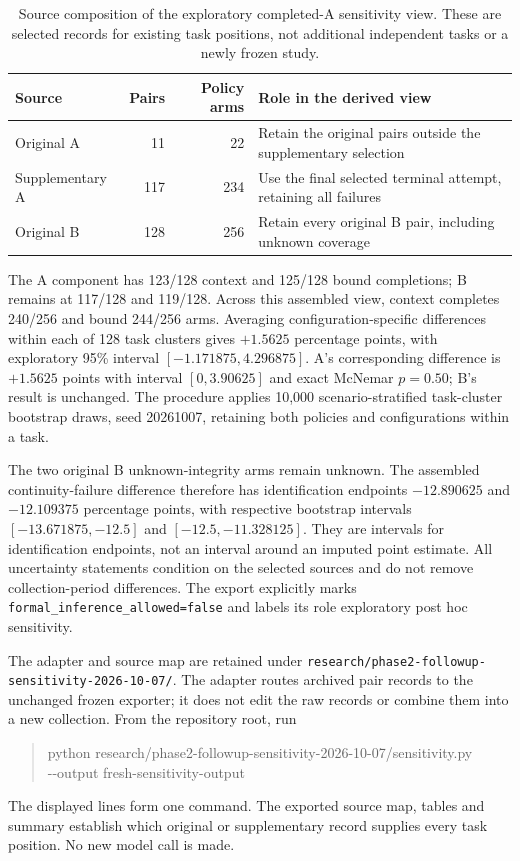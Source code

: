 \documentclass[11pt,a4paper]{article}
\newcommand{\code}[1]{\nolinkurl{#1}}
\begin{document}
\begin{table}[htbp]
\centering\small
\caption{Source composition of the exploratory completed-A sensitivity view. These are selected records for existing task positions, not additional independent tasks or a newly frozen study.}\label{tab:sensitivity-sources}
\begin{tabularx}{\textwidth}{@{}lrrX@{}}
\toprule
Source & Pairs & Policy arms & Role in the derived view \\
\midrule
Original A & 11 & 22 & Retain the original pairs outside the supplementary selection \\
Supplementary A & 117 & 234 & Use the final selected terminal attempt, retaining all failures \\
Original B & 128 & 256 & Retain every original B pair, including unknown coverage \\
\bottomrule
\end{tabularx}
\end{table}

The A component has 123/128 context and 125/128 bound completions; B remains at 117/128 and 119/128. Across this assembled view, context completes 240/256 and bound 244/256 arms. Averaging configuration-specific differences within each of 128 task clusters gives $+1.5625$ percentage points, with exploratory 95\% interval $[-1.171875,4.296875]$. A's corresponding difference is $+1.5625$ points with interval $[0,3.90625]$ and exact McNemar $p=0.50$; B's result is unchanged. The procedure applies 10,000 scenario-stratified task-cluster bootstrap draws, seed 20261007, retaining both policies and configurations within a task.

The two original B unknown-integrity arms remain unknown. The assembled continuity-failure difference therefore has identification endpoints $-12.890625$ and $-12.109375$ percentage points, with respective bootstrap intervals $[-13.671875,-12.5]$ and $[-12.5,-11.328125]$. They are intervals for identification endpoints, not an interval around an imputed point estimate. All uncertainty statements condition on the selected sources and do not remove collection-period differences. The export explicitly marks \code{formal_inference_allowed=false} and labels its role exploratory post hoc sensitivity.

The adapter and source map are retained under \code{research/phase2-followup-sensitivity-2026-10-07/}. The adapter routes archived pair records to the unchanged frozen exporter; it does not edit the raw records or combine them into a new collection. From the repository root, run
\begin{quote}\small\ttfamily
python research/phase2-followup-sensitivity-2026-10-07/sensitivity.py\\
\hspace*{1em}-{}-output fresh-sensitivity-output
\end{quote}
The displayed lines form one command. The exported source map, tables and summary establish which original or supplementary record supplies every task position. No new model call is made.
\end{document}
